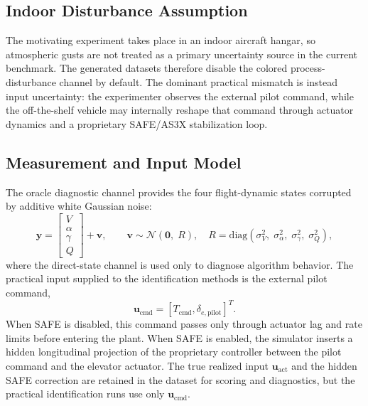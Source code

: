 \documentclass[11pt]{article}
\begin{document}
\subsection*{Indoor Disturbance Assumption}

The motivating experiment takes place in an indoor aircraft hangar, so
atmospheric gusts are not treated as a primary uncertainty source in the
current benchmark. The generated datasets therefore disable the colored
process-disturbance channel by default. The dominant practical mismatch is
instead input uncertainty: the experimenter observes the external pilot
command, while the off-the-shelf vehicle may internally reshape that command
through actuator dynamics and a proprietary SAFE/AS3X stabilization loop.

\subsection*{Measurement and Input Model}

The oracle diagnostic channel provides the four flight-dynamic states
corrupted by additive white Gaussian noise:
\begin{equation}
    \mathbf{y} =
    \begin{bmatrix} V \\ \alpha \\ \gamma \\ Q \end{bmatrix}
    + \boldsymbol{v},
    \qquad
    \boldsymbol{v} \sim
    \mathcal{N}\!\left(\mathbf{0},\;
        R\right),
    \quad
    R = \mathrm{diag}\!\left(
        \sigma_{V}^{2},\;
        \sigma_{\alpha}^{2},\;
        \sigma_{\gamma}^{2},\;
        \sigma_{Q}^{2}
    \right),
    \label{eq:meas}
\end{equation}
where the direct-state channel is used only to diagnose algorithm behavior.
The practical input supplied to the identification methods is the external
pilot command,
\[
\mathbf{u}_{\mathrm{cmd}} = [T_{\mathrm{cmd}},\delta_{e,\mathrm{pilot}}]^T.
\]
When SAFE is disabled, this command passes only through actuator lag and rate
limits before entering the plant. When SAFE is enabled, the simulator inserts
a hidden longitudinal projection of the proprietary controller between the
pilot command and the elevator actuator. The true realized input
$\mathbf{u}_{\mathrm{act}}$ and the hidden SAFE correction are retained in the
dataset for scoring and diagnostics, but the practical identification runs use
only $\mathbf{u}_{\mathrm{cmd}}$.
\end{document}
